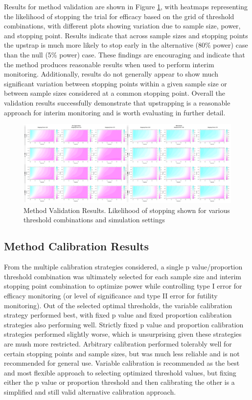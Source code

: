 \documentclass[Afour,sageh,times,square,numbers]{sagej}
\begin{document}
Results for method validation are shown in Figure \ref{fig:first}, with heatmaps representing the likelihood of stopping the trial for efficacy based on the grid of threshold combinations, with different plots showing variation due to sample size, power, and stopping point.  Results indicate that across sample sizes and stopping points the upstrap is much more likely to stop early in the alternative (80\% power) case than the null (5\% power) case.  These findings are encouraging and indicate that the method produces reasonable results when used to perform interim monitoring.  Additionally, results do not generally appear to show much significant variation between stopping points within a given sample size or between sample sizes considered at a common stopping point.  Overall the validation results successfully demonstrate that upstrapping is a reasonable approach for interim monitoring and is worth evaluating in further detail.

\begin{figure}[t]
  \begin{minipage}[t]{1\linewidth}
    \includegraphics[width=\linewidth]{Fig1.png}
    \caption{Method Validation Results.  Likelihood of stopping shown for various threshold combinations and simulation settings}
    \label{fig:first}
  \end{minipage}\hfill%
\end{figure}

\subsection{Method Calibration Results}

From the multiple calibration strategies considered, a single p value/proportion threshold combination was ultimately selected for each sample size and interim stopping point combination to optimize power while controlling type I error for efficacy monitoring (or level of significance and type II error for futility monitoring).  Out of the selected optimal thresholds, the variable calibration strategy performed best, with fixed p value and fixed proportion calibration strategies also performing well.  Strictly fixed p value and proportion calibration strategies performed slightly worse, which is unsurprising given these strategies are mush more restricted.  Arbitrary calibration performed tolerably well for certain stopping points and sample sizes, but was much less reliable and is not recommended for general use.  Variable calibration is recommended as the best and most flexible approach to selecting optimized threshold values, but fixing either the p value or proportion threshold and then calibrating the other is a simplified and still valid alternative calibration approach.
\end{document}
